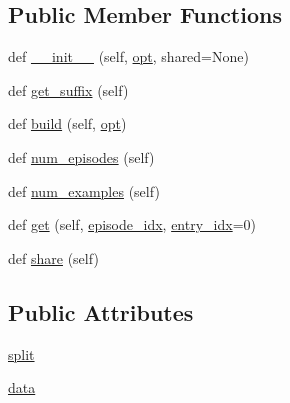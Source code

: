 \subsection*{Public Member Functions}
\begin{DoxyCompactItemize}
\item 
def \hyperlink{classparlai_1_1tasks_1_1dstc7_1_1agents_1_1DSTC7Teacher_a5773b0073045b31e9308070e271e8b15}{\+\_\+\+\_\+init\+\_\+\+\_\+} (self, \hyperlink{classparlai_1_1core_1_1agents_1_1Teacher_a3ce6243860ce978a897922863ed32fa4}{opt}, shared=None)
\item 
def \hyperlink{classparlai_1_1tasks_1_1dstc7_1_1agents_1_1DSTC7Teacher_a2355675a4798e716d6d5788ba9de109e}{get\+\_\+suffix} (self)
\item 
def \hyperlink{classparlai_1_1tasks_1_1dstc7_1_1agents_1_1DSTC7Teacher_a860344433b66b8b163e92b5adc6b72ea}{build} (self, \hyperlink{classparlai_1_1core_1_1agents_1_1Teacher_a3ce6243860ce978a897922863ed32fa4}{opt})
\item 
def \hyperlink{classparlai_1_1tasks_1_1dstc7_1_1agents_1_1DSTC7Teacher_a259540f4c5e9d81c2295a2a45f3f87dd}{num\+\_\+episodes} (self)
\item 
def \hyperlink{classparlai_1_1tasks_1_1dstc7_1_1agents_1_1DSTC7Teacher_aeaff98c183e9c50d97f84c9c3d387aac}{num\+\_\+examples} (self)
\item 
def \hyperlink{classparlai_1_1tasks_1_1dstc7_1_1agents_1_1DSTC7Teacher_adceeb772d4efa50b44f502d38bdb3049}{get} (self, \hyperlink{classparlai_1_1core_1_1teachers_1_1FixedDialogTeacher_afd4ebab8063eb42d182d30a1a41f133e}{episode\+\_\+idx}, \hyperlink{classparlai_1_1core_1_1teachers_1_1FixedDialogTeacher_ae3201b15f3c3b46a2f3511bad9b43e7d}{entry\+\_\+idx}=0)
\item 
def \hyperlink{classparlai_1_1tasks_1_1dstc7_1_1agents_1_1DSTC7Teacher_ae7b7bba23f2f3914186915824280a5d5}{share} (self)
\end{DoxyCompactItemize}
\subsection*{Public Attributes}
\begin{DoxyCompactItemize}
\item 
\hyperlink{classparlai_1_1tasks_1_1dstc7_1_1agents_1_1DSTC7Teacher_a441e080f8a4514fb9c3b8a1872dea4e3}{split}
\item 
\hyperlink{classparlai_1_1tasks_1_1dstc7_1_1agents_1_1DSTC7Teacher_a1410f6e230ea0a01e373e2dde387440a}{data}
\end{DoxyCompactItemize}
